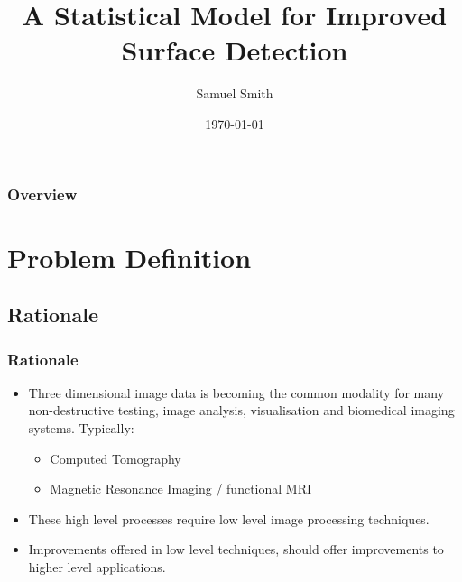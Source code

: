 \documentclass[9pt]{beamer}
\title[Statistical Model for Improved Surface Detection]{A Statistical Model for Improved Surface Detection} %
\author{Samuel Smith} %
\institute[Birmingham City University] %
{
Birmingham City University \\ %
\medskip
\textit{samuel.smith@mail.bcu.ac.uk} %
}
\date{\today} %
\begin{document}
	\begin{frame}
		\titlepage %
	\end{frame}



	\begin{frame}[shrink]
		\frametitle{Overview} %
\begin{multicols}{2}
\tableofcontents
\end{multicols}
\end{frame}
	

\section{Problem Definition}
\subsection{Rationale}
	\begin{frame}
		\frametitle{Rationale}

			\begin{itemize}
				\item Three dimensional image data is becoming the common modality for many non-destructive testing, image analysis, visualisation and biomedical imaging systems. Typically:
				\begin{itemize}
				
				\item Computed Tomography
				\item Magnetic Resonance Imaging / functional MRI
				
				\end{itemize}
				
					\item These high level processes require low level image processing techniques.
				\item Improvements offered in low level techniques, should offer improvements to higher level applications.
			\end{itemize}
	
	\end{frame}
\end{document}
